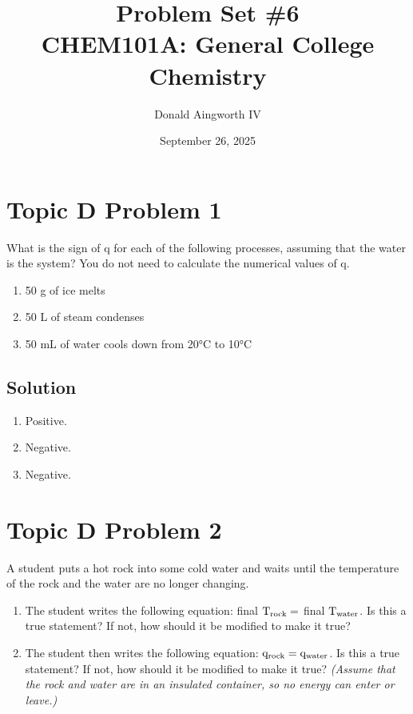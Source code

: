 \documentclass[10pt]{article}
\title{
    Problem Set \#6
    \\  \small
    CHEM101A: General College Chemistry
    }
\author{Donald Aingworth IV}
\date{September 26, 2025}
\begin{document}

    \maketitle


    \pagebreak
    \section{Topic D Problem 1}
        What is the sign of q for each of the following processes, assuming that the water is the system? 
        You do not need to calculate the numerical values of q.
        \begin{enumerate}[label=\alph*)]
            \item 50 g of ice melts
            \item 50 L of steam condenses
            \item 50 mL of water cools down from 20\unit{\celsius} to 10\unit{\celsius}
        \end{enumerate}

        \subsection{Solution}
            \begin{enumerate}[label=\alph*)]
                \item Positive. 
                \item Negative. 
                \item Negative.
            \end{enumerate}

    \pagebreak
    \section{Topic D Problem 2}
        A student puts a hot rock into some cold water and waits until the temperature of the rock and the water are no longer changing.
        \begin{enumerate}[label=\alph*)]
            \item The student writes the following equation: final $\rm T_{rock} =$ final $\rm T_{water}$. Is this a true statement? If not, how should it be modified to make it true?
            \item The student then writes the following equation: $\rm q_{rock} = \rm q_{water}$. Is this a true statement? If not, how should it be modified to make it true? \textit{(Assume that the rock and water are in an insulated container, so no energy can enter or leave.)}
        \end{enumerate}
\end{document}
